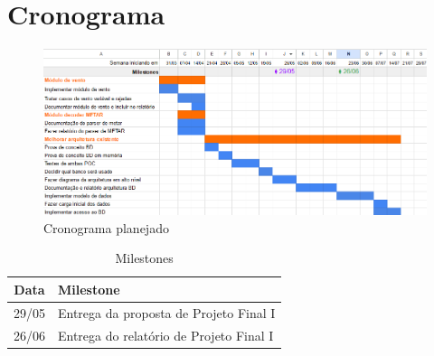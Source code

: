 \chapter{Cronograma}


\begin{figure}[ht]
    \begin{center}
    \includegraphics[width=400pt]{img/cronograma.png}
    \caption{Cronograma planejado}
    \label{fig:efb-a320}
    \end{center}
\end{figure}

\begin{table}[h]
    \centering
    \caption{Milestones}
    \begin{tabular}{|c|l|}
        \hline
        \textbf{Data} & \textbf{Milestone} \\
        \hline
        29/05 & Entrega da proposta de Projeto Final I \\
        26/06 & Entrega do relatório de Projeto Final I \\
        \hline
    \end{tabular}
\end{table}

